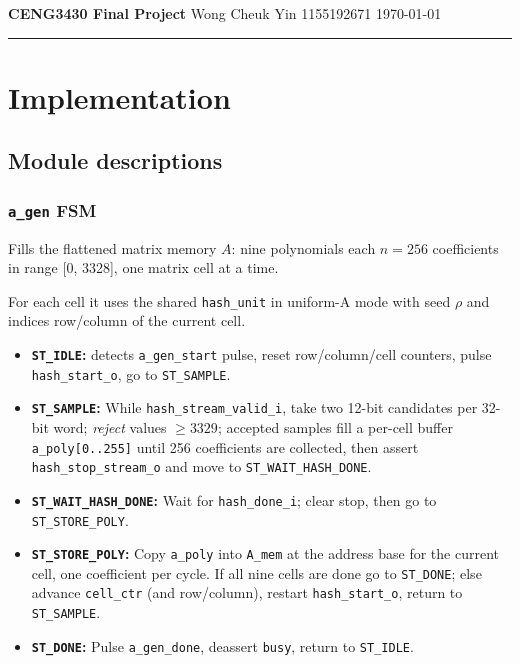 \documentclass[11pt,a4paper]{article}
\begin{document}
\newpage
{\noindent\large\textbf{CENG3430 Final Project} \hfill Wong Cheuk Yin 1155192671 \hfill \today}
\vspace{0.5em}
\hrule
\vspace{0.5em}
\section{Implementation}
\subsection{Module descriptions}

\subsubsection{\texttt{a\_gen} FSM}
Fills the flattened matrix memory $A$: nine polynomials each $n{=}256$ coefficients in range [0, 3328], one matrix cell at a time.

\noindent For each cell it uses the shared \texttt{hash\_unit} in uniform-A mode with seed $\rho$ and indices row/column of the current cell.

\begin{itemize}[nosep]
  \item \textbf{\texttt{ST\_IDLE}:} detects \texttt{a\_gen\_start} pulse, reset row/column/cell counters, pulse \texttt{hash\_start\_o}, go to \texttt{ST\_SAMPLE}.
  \item \textbf{\texttt{ST\_SAMPLE}:} While \texttt{hash\_stream\_valid\_i}, take two 12-bit candidates per 32-bit word; \emph{reject} values $\geq 3329$; accepted samples fill a per-cell buffer \texttt{a\_poly[0..255]} until 256 coefficients are collected, then assert \texttt{hash\_stop\_stream\_o} and move to \texttt{ST\_WAIT\_HASH\_DONE}.
  \item \textbf{\texttt{ST\_WAIT\_HASH\_DONE}:} Wait for \texttt{hash\_done\_i}; clear stop, then go to \texttt{ST\_STORE\_POLY}.
  \item \textbf{\texttt{ST\_STORE\_POLY}:} Copy \texttt{a\_poly} into \texttt{A\_mem} at the address base for the current cell, one coefficient per cycle.
        If all nine cells are done go to \texttt{ST\_DONE}; else advance \texttt{cell\_ctr} (and row/column), restart \texttt{hash\_start\_o}, return to \texttt{ST\_SAMPLE}.
  \item \textbf{\texttt{ST\_DONE}:} Pulse \texttt{a\_gen\_done}, deassert \texttt{busy}, return to \texttt{ST\_IDLE}.
\end{itemize}
\end{document}
